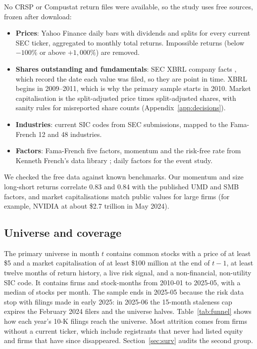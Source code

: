 \documentclass[11pt,a4paper]{article}
\begin{document}
No CRSP or Compustat return files were available, so the study uses free sources, frozen after download:
\begin{itemize}
  \item \textbf{Prices}: Yahoo Finance daily bars with dividends and splits for every current SEC ticker, aggregated to monthly
  total returns. Impossible returns (below $-100\%$ or above $+1{,}000\%$) are removed.
  \item \textbf{Shares outstanding and fundamentals}: SEC XBRL company facts \citep{secedgar}, which record the date each value
  was filed, so they are point in time. XBRL begins in 2009--2011, which is why the primary sample starts in 2010.
  Market capitalisation is the split-adjusted price times split-adjusted shares, with sanity rules for misreported share
  counts (Appendix~\ref{app:decisions}).
  \item \textbf{Industries}: current SIC codes from SEC submissions, mapped to the Fama-French 12 and 48 industries.
  \item \textbf{Factors}: Fama-French five factors, momentum and the risk-free rate from Kenneth French's data library
  \citep{frenchlib}; daily factors for the event study.
\end{itemize}
We checked the free data against known benchmarks. Our momentum and size long-short returns correlate 0.83 and 0.84
with the published UMD and SMB factors, and market capitalisations match public values for large firms (for example,
NVIDIA at about \$2.7 trillion in May 2024).

\subsection{Universe and coverage}

The primary universe in month $t$ contains common stocks with a price of at least \$5 and a market capitalisation of at
least \$100 million at the end of $t-1$, at least twelve months of return history, a live risk signal, and a non-financial,
non-utility SIC code. It contains \NFirmsPanel{} firms and \NStockMonths{} stock-months from 2010-01 to 2025-05, with a
median of \MedianNames{} stocks per month. The sample ends in 2025-05 because the risk data stop with filings made in
early 2025: in 2025-06 the 15-month staleness cap expires the February 2024 filers and the universe halves.
Table~\ref{tab:funnel} shows how each year's 10-K filings reach the universe. Most attrition comes from firms without a
current ticker, which include registrants that never had listed equity and firms that have since disappeared.
Section~\ref{sec:surv} audits the second group.
\end{document}
